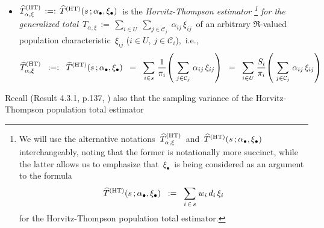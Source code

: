 \begin{itemize}
\begin{itemize}
        $w_{i} \,:=\, \dfrac{1}{\pi_{i}}$,\, for each population unit \,$i \in U$,\,
        is the (\textit{a priori} known, non-random) design weight of \,$i \in U$,\,
        i.e., the reciprocal of the selection probability \,$\pi_{i}$\,
        (assumed strictly positive) of \,$i \in U$,\,
    \item
        $\widehat{T}^{\textnormal{(HT)}}_{\alpha,\xi} \, :=: \,\widehat{T}^{\textnormal{(HT)}}(s\,;\alpha_{\bullet},\xi_{\bullet})$\,
        is the \textit{Horvitz-Thompson estimator\! \footnote{
        We will use the alternative notations
            \,$\widehat{T}^{\textnormal{(HT)}}_{\alpha,\xi}$\, and \,$\widehat{T}^{\textnormal{(HT)}}(s\,;\alpha_{\bullet},\xi_{\bullet})$\,
            interchangeably, noting that the former is notationally more succinct,
            while the latter allows us to emphasize that
            \,$\xi_{\bullet}$\,
            is being considered as an argument to the formula
            \begin{equation*}
            \widehat{T}^{\textnormal{(HT)}}(s\,;\alpha_{\bullet},\xi_{\bullet})
            \;\; := \;\;
                \underset{i\,\in\,s}{\sum}\;w_{i}\,d_{i}\,\xi_{i}
            \end{equation*}
            for the Horvitz-Thompson population total estimator.
            }
        for the generalized total}
        \,$
        T_{\alpha,\xi}
        \, := \,
            \underset{i \in U}{\sum}\;
            \underset{j \in \mathcal{C}_{j}}{\sum}\;
            \alpha_{ij}\,\xi_{ij}
        $\,
        of an arbitrary $\Re$-valued population characteristic
        \,$\xi_{ij}$ ($i \in U$, $j \in \mathcal{C}_{i}$),\, i.e.,
        \begin{equation*}
        \widehat{T}^{\textnormal{(HT)}}_{\alpha,\xi}
        \;\; :=: \;\;
            \widehat{T}^{\textnormal{(HT)}}(s\,;\alpha_{\bullet},\xi_{\bullet})
        \;\; = \;\;
            \underset{i \in s}{\sum}\;
                \dfrac{1}{\pi_{i}}\!
                \left(\;
                    \underset{j \in \mathcal{C}_{j}}{\sum}\;
                    \alpha_{ij}\,\xi_{ij}
                    \right)
        \;\; = \;\;
            \underset{i \in U}{\sum}\;
                \dfrac{S_{i}}{\pi_{i}}\!
                \left(\;
                    \underset{j \in \mathcal{C}_{j}}{\sum}\;
                    \alpha_{ij}\,\xi_{ij}
                    \right)
        \end{equation*}
    \end{itemize}
    Recall (Result 4.3.1, p.137, \cite{Sarndal1992}) also that
    the sampling variance of the Horvitz-Thompson population total estimator

\end{itemize}
